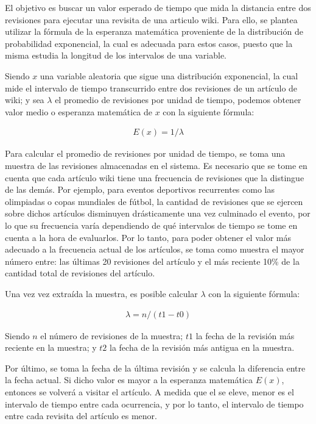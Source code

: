 El objetivo es buscar un valor esperado de tiempo que mida la distancia entre dos revisiones para ejecutar una revisita de una articulo wiki.
Para ello, se plantea utilizar la fórmula de la esperanza matemática proveniente de la distribución de probabilidad exponencial, la cual es adecuada para estos casos, puesto que la misma estudia la longitud de los intervalos de una variable.

Siendo $x$  una variable aleatoria que sigue una distribución exponencial, la cual mide el intervalo de tiempo transcurrido entre dos revisiones de un artículo de wiki;
y sea $\lambda$ el promedio de revisiones por unidad de tiempo, podemos obtener valor medio o esperanza  matemática de $x$ con la siguiente fórmula:

\begin{gather*}
E(x) = 1 / \lambda
\end{gather*}

Para calcular el promedio de revisiones por unidad de tiempo, se toma una muestra de las revisiones almacenadas en el sistema.
Es necesario que se tome en cuenta que cada artículo wiki tiene una frecuencia de revisiones que la distingue de las demás.
Por ejemplo, para eventos deportivos recurrentes como las olimpiadas o copas mundiales de fútbol, la cantidad de revisiones que se ejercen sobre dichos artículos disminuyen drásticamente una vez culminado el evento, por lo que su frecuencia varía dependiendo de qué intervalos de tiempo se tome en cuenta a la hora de evaluarlos.
Por lo tanto, para poder obtener el valor más adecuado a la frecuencia actual de los artículos, se toma como muestra el mayor número entre: las últimas 20 revisiones del artículo y el más reciente 10\% de la cantidad total de revisiones del artículo.

Una vez vez extraída la muestra, es posible calcular $\lambda$ con la siguiente fórmula:

\begin{gather*}
\lambda = n / (t1 - t0)
\end{gather*}

Siendo $n$ el número de revisiones de la muestra;
$t1$ la fecha de la revisión más reciente en la muestra;
y $t2$ la fecha de la revisión más antigua en la muestra.

Por último, se toma la fecha de la última revisión y se calcula la diferencia entre la fecha actual.
Si dicho valor es mayor a la esperanza matemática $E(x)$, entonces se volverá a visitar el artículo.
A medida que el  se eleve, menor es el intervalo de tiempo entre cada ocurrencia, y por lo tanto, el intervalo de tiempo entre cada revisita del artículo es menor.


